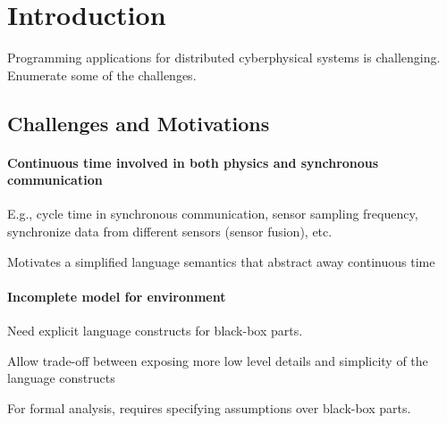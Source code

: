 \section{Introduction}
\label{sec:intro}


Programming applications for distributed cyberphysical systems is challenging.
Enumerate some of the challenges.

\subsection{Challenges and Motivations~}

\paragraph{Continuous time involved in both physics and synchronous communication}
E.g., cycle time in synchronous communication, sensor sampling frequency, synchronize data from different sensors (sensor fusion), etc.

Motivates a simplified language semantics that abstract away continuous time


\paragraph{Incomplete model for environment}

Need explicit language constructs for black-box parts.

Allow trade-off between exposing more low level details and simplicity of the language constructs

For formal analysis, requires specifying assumptions over black-box parts.



